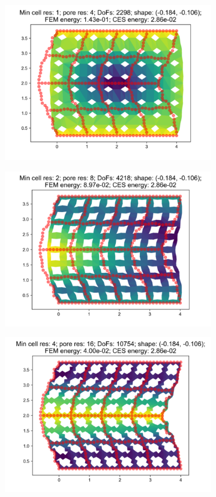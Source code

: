 \begin{figure}[H]
\begin{subfigure}{.45\textwidth}
  \centering
  \includegraphics[width=.8\linewidth]{lces/vis_compression/bm_5_mesh_0.png}
\end{subfigure}
\begin{subfigure}{.45\textwidth}
  \centering
  \includegraphics[width=.8\linewidth]{lces/vis_compression/bm_5_mesh_1.png}
\end{subfigure}
\newline
\begin{subfigure}{.45\textwidth}
  \centering
  \includegraphics[width=.8\linewidth]{lces/vis_compression/bm_5_mesh_2.png}

\end{subfigure}
\end{figure}
